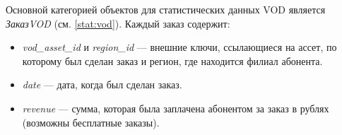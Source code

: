 Основной категорией объектов для статистических данных VOD является \textit{ЗаказVOD} (см. \ref{stat:vod}).
Каждый заказ содержит:
\begin{itemize}
\item{
  \textit{vod\_asset\_id} и \textit{region\_id} --- внешние ключи, ссылающиеся на ассет, по которому был сделан
заказ и регион, где находится филиал абонента.
}
\item{
  \textit{date} --- дата, когда был сделан заказ.
}
\item{
  \textit{revenue} --- сумма, которая была заплачена абонентом за заказ в рублях (возможны бесплатные заказы).
}
\end{itemize}

